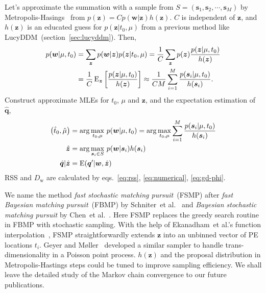 Let's approximate the summation with a sample from $S = (\bm{s}_1, \bm{s}_2, \cdots, \bm{s}_M)$ by Metropolis-Hasings~\cite{metropolis_equation_1953, hastings_monte_1970, mackay_information_2003} from $p(\bm{z}) = C p(\bm{w} | \bm{z}) h( \bm{z})$. $C$ is independent of $\bm{z}$, and $h(\bm{z})$ is an educated guess for $p(\bm{z}|t_0, \mu)$ from a previous method like LucyDDM~(section~\ref{sec:lucyddm}). Then,
\begin{equation}
  \label{eq:mh}
  \begin{aligned}
    p(\bm{w}|\mu, t_0) &= \sum_{\bm{z}} p(\bm{w}|\bm{z}) p(\bm{z}|t_0, \mu) = \frac{1}{C}\sum_{\bm{z}} p(\bm{z}) \frac{p(\bm{z} | \mu, t_0)}{h(\bm{z})} \\
    &= \frac{1}{C} \operatorname{E}_{\bm{z}}\left[ \frac{p(\bm{z} | \mu, t_0)}{h(\bm{z})} \right] \approx \frac{1}{CM} \sum_{i=1}^M \frac{p(\bm{s}_i | \mu, t_0)}{h(\bm{s}_i)}. \\
  \end{aligned}
\end{equation}
Construct approximate MLEs for $t_0$, $\mu$ and $\bm{z}$, and the expectation estimation of $\hat{\bm{q}}$,
\begin{equation}
  \label{eq:fsmpcharge}
  \begin{aligned}
    \left(\hat{t}_0, \hat{\mu}\right) &= \arg\underset{t_0,\mu}{\max}~p(\bm{w}|\mu, t_0) = \arg\underset{t_0,\mu}{\max} \sum_{i=1}^M \frac{p(\bm{s}_i | \mu, t_0)}{h(\bm{s}_i)}\\
    \hat{\bm{z}} &= \arg \underset{\bm{s}_i \in S}{\max}~p(\bm{w}|\bm{s}_i) h(\bm{s}_i) \\
    \hat{\bm{q}}|{\hat{\bm{z}}} &= \operatorname{E}(\bm{q}'|\bm{w},\hat{\bm{z}})
  \end{aligned}
\end{equation}
RSS and $D_\mathrm{w}$ are calculated by eqs.~\eqref{eq:rss}, \eqref{eq:numerical}, \eqref{eq:gd-phi}.

We name the method \emph{fast stochastic matching pursuit}~(FSMP) after \emph{fast Bayesian matching pursuit}~(FBMP) by Schniter~et al.~\cite{schniter_fast_2008} and \emph{Bayesian stochastic matching pursuit} by Chen~et al.~\cite{chen_stochastic_2011}.  Here FSMP replaces the greedy search routine in FBMP with stochastic sampling.  With the help of Ekanadham~et al.'s function interpolation~\cite{ekanadham_recovery_2011}, FSMP straightforwardly extends $\bm{z}$ into an unbinned vector of PE locations $t_i$.  Geyer and Møller~\cite{geyer_simulation_1994} developed a similar sampler to handle trans-dimensionality in a Poisson point process.  $h(\bm{z})$ and the proposal distribution in Metropolis-Hastings steps could be tuned to improve sampling efficiency.  We shall leave the detailed study of the Markov chain convergence to our future publications.

